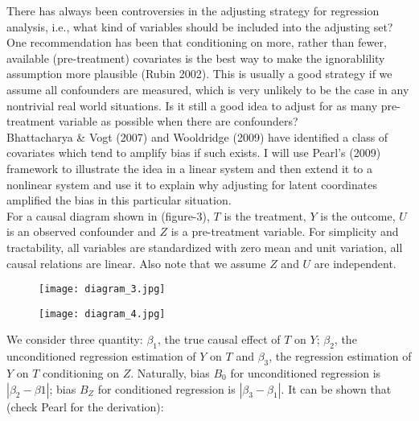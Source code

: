 \documentclass[11pt]{article}
\begin{document}
There has always been controversies in the adjusting strategy for regression analysis, i.e., what kind of variables should be included into the adjusting set? One recommendation has been that conditioning on more, rather than fewer, available (pre-treatment) covariates is the best way to make the ignorablility assumption more plausible (Rubin 2002). This is usually a good strategy if we assume all confounders are measured, which is very unlikely to be the case in any nontrivial real world situations. Is it still a good idea to adjust for as many pre-treatment variable as possible when there are confounders?\\

Bhattacharya \& Vogt (2007) and Wooldridge (2009) have identified a class of covariates which tend to amplify bias if such exists. I will use Pearl's (2009) framework to illustrate the idea in a linear system and then extend it to a nonlinear system and use it to explain why adjusting for latent coordinates amplified the bias in this particular situation.\\

For a causal diagram shown in (figure-3), $T$ is the treatment, $Y$ is the outcome, $U$ is an observed confounder and $Z$ is a pre-treatment variable. For simplicity and tractability, all variables are standardized with zero mean and unit variation, all causal relations are linear.  Also note that we assume $Z$ and $U$ are independent.\\

\begin{figure}
\centering
\begin{minipage}{.5\textwidth}
 \centering
 \hspace*{-1.2in} %
  \texttt{[image: diagram\_3.jpg]}
  \label{fig:diagram1}
\end{minipage}%
\begin{minipage}{.5\textwidth}
\centering
\hspace*{-0.2in} %
  \texttt{[image: diagram\_4.jpg]}
  \label{fig:diagram2}
\end{minipage}
\end{figure}

We consider three quantity: $\beta_1$, the true causal effect of $T$ on $Y$; $\beta_2$, the unconditioned regression estimation of $Y$ on $T$ and $\beta_3$, the regression estimation of $Y$ on $T$ conditioning on $Z$. Naturally, bias $B_0$ for unconditioned regression is $|\beta_2 - \beta1|$; bias $B_Z$ for conditioned regression is $|\beta_3-\beta_1|$. It can be shown that (check Pearl for the derivation):
\end{document}
